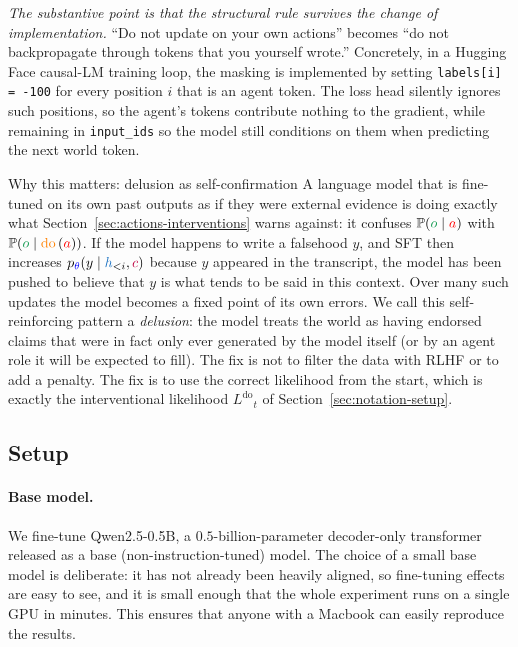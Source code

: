 \documentclass[11pt]{article}
\newcommand{\action}{\ensuremath{\textcolor{red}{a}}}
\newcommand{\obs}{\ensuremath{\textcolor{ForestGreen}{o}}}
\newcommand{\contextsym}{\ensuremath{\textcolor{purple}{c}}}
\newcommand{\history}{\ensuremath{\textcolor{RoyalBlue}{h}}}
\newcommand{\thetap}{\ensuremath{\textcolor{blue}{\theta}}}
\newcommand{\prob}{\ensuremath{\mathbb{P}}}
\newcommand{\lik}{\ensuremath{L}}
\newcommand{\dolik}{\ensuremath{\lik^{\mathrm{do}}}}
\newcommand{\doop}{\operatorname{\textcolor{orange}{do}}}
\newcommand{\intervene}[1]{\ensuremath{\doop \left(#1\right)}}
\begin{document}
\emph{The substantive point is that the structural rule survives the change of
implementation.} ``Do not update on your own actions'' becomes ``do not
backpropagate through tokens that you yourself wrote.'' Concretely, in a
Hugging Face causal-LM training loop, the masking is implemented by setting
\texttt{labels[i] = -100} for every position $i$ that is an agent token. The
loss head silently ignores such positions, so the agent's tokens contribute
nothing to the gradient, while remaining in \texttt{input\_ids} so the model
still conditions on them when predicting the next world token.

\begin{warningbox}{Why this matters: delusion as self-confirmation}
A language model that is fine-tuned on its own past outputs as if they were
external evidence is doing exactly what
Section~\ref{sec:actions-interventions} warns against: it confuses
$\prob(\obs\mid\action)$ with $\prob(\obs\mid\intervene{\action})$. If the
model happens to write a falsehood $y$, and SFT then increases
$p_{\thetap}(y\mid\history_{<i},\contextsym)$ because $y$ appeared in the
transcript, the model has been pushed to believe that $y$ is what tends to be
said in this context. Over many such updates the model becomes a fixed point
of its own errors. We call this self-reinforcing pattern a
\emph{delusion}: the model treats the world as having endorsed claims that
were in fact only ever generated by the model itself (or by an agent role it
will be expected to fill). The fix is not to filter the data with RLHF or to add a
penalty. The fix is to use the correct likelihood from the start, which is
exactly the interventional likelihood $\dolik_t$ of
Section~\ref{sec:notation-setup}.
\end{warningbox}


\subsection{Setup}
\label{sec:experiment-setup}

\paragraph{Base model.}
We fine-tune Qwen2.5-0.5B, a $0.5$-billion-parameter decoder-only transformer
released as a base (non-instruction-tuned) model. The choice of a small base
model is deliberate: it has not already been heavily aligned, so fine-tuning
effects are easy to see, and it is small enough that the whole experiment runs
on a single GPU in minutes. This ensures that anyone with a Macbook can easily reproduce the results. 
\end{document}
